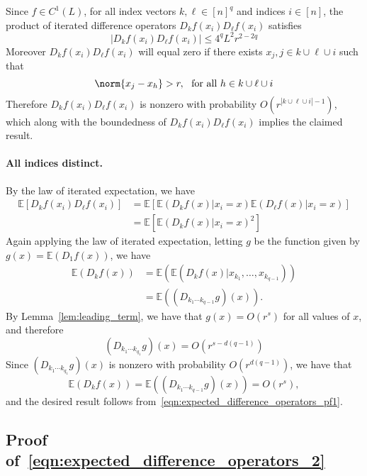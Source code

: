 \documentclass{article}
\newcommand{\abs}[1]{\left \lvert #1 \right \rvert}
\newcommand{\1}{\mathbf{1}}
\newcommand{\Ebb}{\mathbb{E}}
\theoremstyle{alden}
\theoremstyle{aldenthm}
\theoremstyle{definition}
\theoremstyle{remark}
\begin{document}
Since $f \in C^1(L)$, for all index vectors $k,\ell \in [n]^q$ and indices $i \in [n]$, the product of iterated difference operators $D_kf(x_i) D_{\ell}f(x_i)$ satisfies
\begin{equation*}
\abs{D_kf(x_i) D_{\ell}f(x_i)} \leq 4^{q} L^2 r^{2 - 2q}
\end{equation*}
Moreover $D_kf(x_i) D_{\ell}f(x_i)$ will equal zero if there exists $x_j, j \in k \cup \ell \cup i$ such that
\begin{equation*}
\norm{x_j - x_h} > r,~~\textrm{for all $h \in k \cup \ell \cup i$}
\end{equation*}
Therefore $D_kf(x_i) D_{\ell}f(x_i)$ is nonzero with probability $O(r^{\abs{k \cup \ell \cup i} - 1})$, which along with the boundedness of $D_kf(x_i) D_{\ell}f(x_i)$ implies the claimed result.

\paragraph{All indices distinct.}

By the law of iterated expectation, we have
\begin{align}
\Ebb\left[D_kf(x_i)D_{\ell}f(x_i)\right] & = \Ebb\left[\Ebb\left(D_kf(x)|x_i = x\right) \Ebb\left(D_{\ell}f(x)|x_i = x\right)\right] \nonumber \\
& = \Ebb\left[\Ebb\left(D_kf(x)|x_i = x\right)^2\right] \label{eqn:expected_difference_operators_pf1}
\end{align}
Again applying the law of iterated expectation, letting $g$ be the function given by $g(x) = \Ebb(D_1f(x))$, we have
\begin{align*}
\Ebb(D_kf(x)) & = \Ebb(\Ebb(D_{k}f(x)|x_{k_1},\ldots,x_{k_{q-1}})) \\
& = \Ebb((D_{k_1\cdots k_{q - 1}}g)(x)).
\end{align*}
By Lemma~\ref{lem:leading_term}, we have that $g(x) = O(r^s)$ for all values of $x$, and therefore
\begin{equation*}
(D_{k_1\cdots k_{q_1}}g)(x) = O(r^{s - d(q - 1)})
\end{equation*}
Since $(D_{k_1\cdots k_{q_1}}g)(x)$ is nonzero with probability $O(r^{d(q - 1)})$, we have that 
\begin{equation*}
\Ebb(D_kf(x)) = \Ebb((D_{k_1\cdots k_{q - 1}}g)(x)) = O(r^s),
\end{equation*}
and the desired result follows from~\eqref{eqn:expected_difference_operators_pf1}.

\subsection{Proof of~\eqref{eqn:expected_difference_operators_2}}
\end{document}
